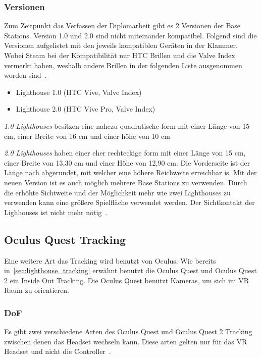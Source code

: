 \subsubsection{Versionen}

Zum Zeitpunkt das Verfassen der Diplomarbeit gibt es 2 Versionen der Base Stations.
Version 1.0 und 2.0 sind nicht miteinander kompatibel.
Folgend sind die Versionen aufgelistet mit den jeweils kompatiblen Geräten in der Klammer.
Wobei Steam bei der Kompatibilität nur HTC Brillen und die Valve Index vermerkt haben, weshalb andere Brillen in der folgenden Liste ausgenommen worden sind~\cite{steam_lighhouse_versions}.

\begin{itemize}
    \item Lighthouse 1.0 (HTC Vive, Valve Index)
    \item Lighthouse 2.0 (HTC Vive Pro, Valve Index)
\end{itemize}

\emph{1.0 Lighthouses} besitzen eine nahezu quadratische form mit einer Länge von 15 cm, einer Breite von 16 cm und einer höhe von 10 cm

\emph{2.0 Lighthouses} haben einer eher rechteckige form mit einer Länge von 15 cm, einer Breite von 13,30 cm und einer Höhe von 12,90 cm.
Die Vorderseite ist der Länge nach abgerundet, mit welcher eine höhere Reichweite erreichbar is.
Mit der neuen Version ist es auch möglich mehrere Base Stations zu verwenden.
Durch die erhöhte Sichtweite und der Möglichkeit mehr wie zwei Lighthouses zu verwenden kann eine größere Spielfläche verwendet werden.
Der Sichtkontakt der Lighhouses ist nicht mehr nötig~\cite{Cale_2019}.

\subsection{Oculus Quest Tracking}
\label{sec:oculus_quest_tracking}

Eine weitere Art das Tracking wird benutzt von Oculus.
Wie bereits in~\ref{sec:lighthouse_tracking} erwähnt benutzt die Oculus Quest und Oculus Quest 2 ein Inside Out Tracking.
Die Oculus Quest benützt Kameras, um sich im VR Raum zu orientieren.

\subsubsection{DoF}

Es gibt zwei verschiedene Arten des Oculus Quest und Oculus Quest 2 Tracking zwischen denen das Headset wechseln kann.
Diese arten gelten nur für das VR Headset und nicht die Controller~\cite{oculus_support_headset_tracking}.

